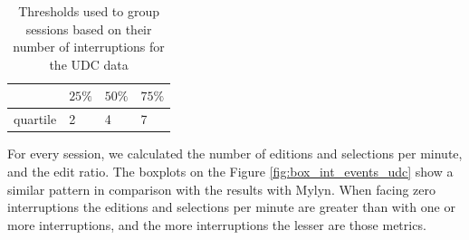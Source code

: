 \documentclass[times]{smrauth}
\begin{document}
\begin{table}[ht!]
\renewcommand{\arraystretch}{1.3}
\caption{Thresholds used to group sessions based on their number of interruptions for the UDC data} %
\label{tbl:quartil_int_udc}
\centering
\begin{tabular}{l | p{0.6cm} | p{0.6cm} | p{0.6cm}} 
     & $25\%$ & $50\%$ & $75\%$ \\  
  \hline 
  quartile &  2 & 4 & 7  \\   
\end{tabular}
\end{table}

For every session, we calculated the number of editions and selections per minute, and the edit ratio. The boxplots on the Figure \ref{fig:box_int_events_udc} show a similar pattern in comparison with the results with Mylyn. When facing zero interruptions the editions and selections per minute are greater than with one or more interruptions, and the more interruptions the lesser are those metrics.
\end{document}
